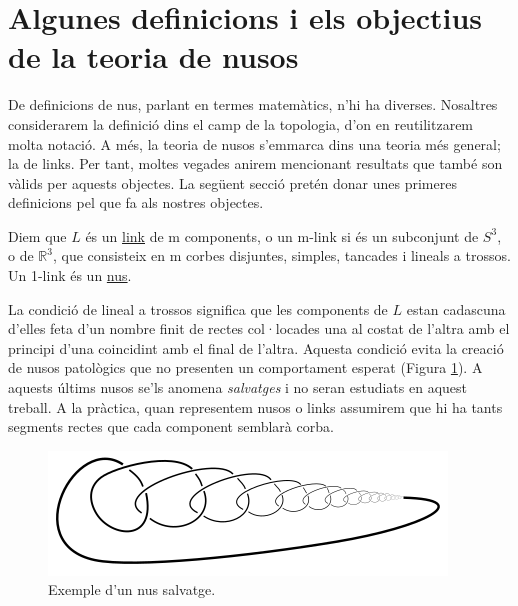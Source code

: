 
\section{Algunes definicions i els objectius de la teoria de nusos}\label{sec:Algunes definicions i els objectius de la teoria de nusos}

De definicions de nus, parlant en termes matemàtics, n'hi ha diverses. Nosaltres considerarem la definició dins el camp de la topologia, d'on en reutilitzarem molta notació. A més, la teoria de nusos s'emmarca dins una teoria més general; la de links. Per tant, moltes vegades anirem mencionant resultats que també son vàlids per aquests objectes. La següent secció pretén donar unes primeres definicions pel que fa als nostres objectes.

\begin{definition}\label{def: Definició de nus}
	Diem que $L$ és un \underline{link} de m components, o un m-link si és un subconjunt de $S^3$, o de $\mathbb{R}^3$, que consisteix en m corbes disjuntes, simples, tancades i lineals a trossos. Un 1-link és un \underline{nus}.
\end{definition}

La condició de lineal a trossos significa que les components de $L$ estan cadascuna d'elles feta d'un nombre finit de rectes col·locades una al costat de l'altra amb el principi d'una coincidint amb el final de l'altra. Aquesta condició evita la creació de nusos patològics que no presenten un comportament esperat (Figura \ref{fig:nussalvatge}). A aquests últims nusos se'ls anomena \textit{salvatges} i no seran estudiats en aquest treball. A la pràctica, quan representem nusos o links assumirem que hi ha tants segments rectes que cada component semblarà corba.\\

\begin{figure}
	\centering
	\includegraphics[width=0.9\linewidth]{img/wildknot.png}
	\caption{Exemple d'un nus salvatge.}\label{fig:nussalvatge}
\end{figure}

